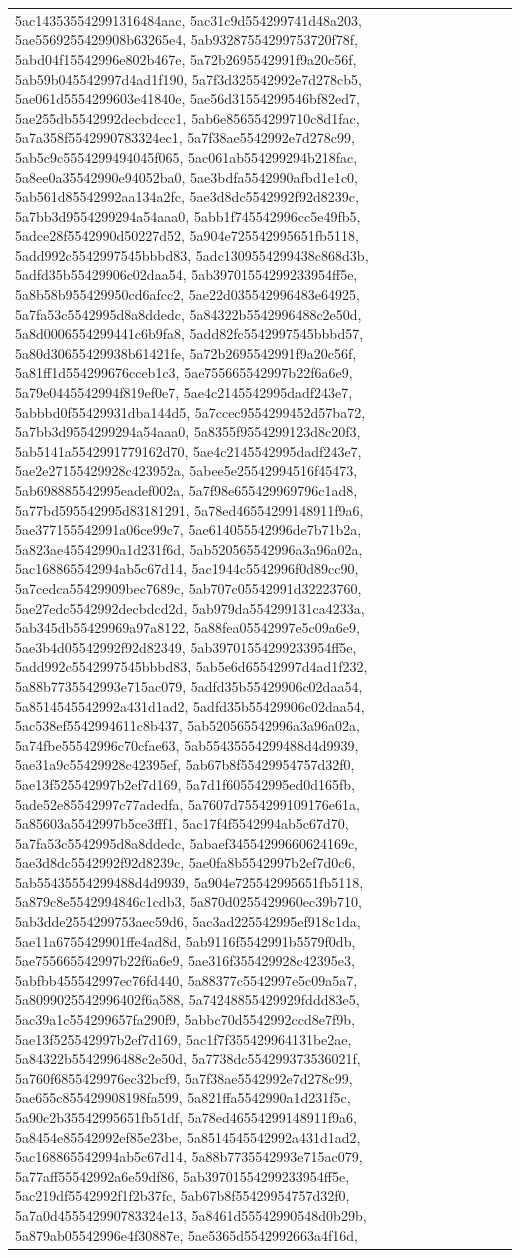 \documentclass{article} %
\begin{document}
\begin{table}[h!]
\begin{tabular}{|p{12cm}|}
5ac143535542991316484aac, 5ac31c9d554299741d48a203, 5ae5569255429908b63265e4, 5ab93287554299753720f78f, 5abd04f15542996e802b467e, 5a72b2695542991f9a20c56f, 5ab59b045542997d4ad1f190, 5a7f3d325542992e7d278cb5, 5ae061d5554299603e41840e, 5ae56d31554299546bf82ed7, 5ae255db5542992decbdccc1, 5ab6e856554299710c8d1fac, 5a7a358f5542990783324ec1, 5a7f38ae5542992e7d278c99, 5ab5c9c5554299494045f065, 5ac061ab554299294b218fac, 5a8ee0a35542990e94052ba0, 5ae3bdfa5542990afbd1e1c0, 5ab561d85542992aa134a2fc, 5ae3d8dc5542992f92d8239c, 5a7bb3d9554299294a54aaa0, 5abb1f745542996cc5e49fb5, 5adce28f5542990d50227d52, 5a904e725542995651fb5118, 5add992c5542997545bbbd83, 5adc1309554299438c868d3b, 5adfd35b55429906c02daa54, 5ab39701554299233954ff5e, 5a8b58b955429950cd6afcc2, 5ae22d035542996483e64925, 5a7fa53c5542995d8a8ddedc, 5a84322b5542996488c2e50d, 5a8d0006554299441c6b9fa8, 5add82fc5542997545bbbd57, 5a80d30655429938b61421fe, 5a72b2695542991f9a20c56f, 5a81ff1d554299676cceb1c3, 5ae755665542997b22f6a6e9, 5a79e0445542994f819ef0e7, 5ae4c2145542995dadf243e7, 5abbbd0f55429931dba144d5, 5a7ccec9554299452d57ba72, 5a7bb3d9554299294a54aaa0, 5a8355f9554299123d8c20f3, 5ab5141a5542991779162d70, 5ae4c2145542995dadf243e7, 5ae2e27155429928c423952a, 5abee5e25542994516f45473, 5ab698885542995eadef002a, 5a7f98e655429969796c1ad8, 5a77bd595542995d83181291, 5a78ed46554299148911f9a6, 5ae377155542991a06ce99c7, 5ae614055542996de7b71b2a, 5a823ae45542990a1d231f6d, 5ab520565542996a3a96a02a, 5ac168865542994ab5c67d14, 5ac1944c5542996f0d89cc90, 5a7cedca55429909bec7689c, 5ab707c05542991d32223760, 5ae27edc5542992decbdcd2d, 5ab979da554299131ca4233a, 5ab345db55429969a97a8122, 5a88fea05542997e5c09a6e9, 5ae3b4d05542992f92d82349, 5ab39701554299233954ff5e, 5add992c5542997545bbbd83, 5ab5e6d65542997d4ad1f232, 5a88b7735542993e715ac079, 5adfd35b55429906c02daa54, 5a8514545542992a431d1ad2, 5adfd35b55429906c02daa54, 5ac538ef5542994611c8b437, 5ab520565542996a3a96a02a, 5a74fbe55542996c70cfae63, 5ab55435554299488d4d9939, 5ae31a9c55429928c42395ef, 5ab67b8f55429954757d32f0, 5ae13f525542997b2ef7d169, 5a7d1f605542995ed0d165fb, 5ade52e85542997c77adedfa, 5a7607d7554299109176e61a, 5a85603a5542997b5ce3fff1, 5ac17f4f5542994ab5c67d70, 5a7fa53c5542995d8a8ddedc, 5abaef34554299660624169c, 5ae3d8dc5542992f92d8239c, 5ae0fa8b5542997b2ef7d0c6, 5ab55435554299488d4d9939, 5a904e725542995651fb5118, 5a879c8e5542994846c1cdb3, 5a870d0255429960ec39b710, 5ab3dde2554299753aec59d6, 5ac3ad225542995ef918c1da, 5ae11a6755429901ffe4ad8d, 5ab9116f5542991b5579f0db, 5ae755665542997b22f6a6e9, 5ae316f355429928c42395e3, 5abfbb455542997ec76fd440, 5a88377c5542997e5c09a5a7, 5a8099025542996402f6a588, 5a74248855429929fddd83e5, 5ac39a1c554299657fa290f9, 5abbc70d5542992ccd8e7f9b, 5ae13f525542997b2ef7d169, 5ac1f7f355429964131be2ae, 5a84322b5542996488c2e50d, 5a7738dc554299373536021f, 5a760f6855429976ec32bcf9, 5a7f38ae5542992e7d278c99, 5ae655c855429908198fa599, 5a821ffa5542990a1d231f5c, 5a90c2b35542995651fb51df, 5a78ed46554299148911f9a6, 5a8454e85542992ef85e23be, 5a8514545542992a431d1ad2, 5ac168865542994ab5c67d14, 5a88b7735542993e715ac079, 5a77aff55542992a6e59df86, 5ab39701554299233954ff5e, 5ac219df5542992f1f2b37fc, 5ab67b8f55429954757d32f0, 5a7a0d455542990783324e13, 5a8461d55542990548d0b29b, 5a879ab05542996e4f30887e, 5ae5365d5542992663a4f16d, 
\end{tabular}
\end{table}
\end{document}
